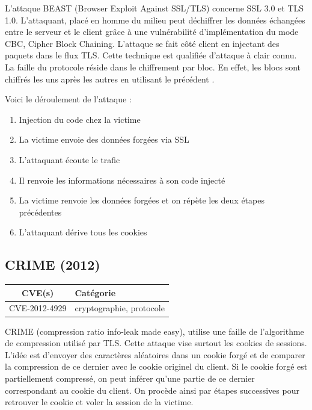 L'attaque BEAST (Browser Exploit Against SSL/TLS) concerne SSL 3.0 et TLS 1.0. L'attaquant, placé en homme du milieu peut déchiffrer les données échangées entre le serveur et le client grâce à une vulnérabilité d'implémentation du mode CBC, Cipher Block Chaining. L'attaque se fait côté client en injectant des paquets dans le flux TLS. Cette technique est qualifiée d'attaque à clair connu. La faille du protocole réside dans le chiffrement par bloc. En effet, les blocs sont chiffrés les uns après les autres en utilisant le précédent \cite{beast}.

Voici le déroulement de l'attaque :

\begin{enumerate}
\item Injection du code chez la victime
\item La victime envoie des données forgées via SSL
\item L'attaquant écoute le trafic
\item Il renvoie les informations nécessaires à son code injecté
\item La victime renvoie les données forgées et on répète les deux étapes précédentes
  \item L'attaquant dérive tous les cookies
\end{enumerate}



\subsection{CRIME (2012)}

\begin{tabularx}{0.96\textwidth}{|c|X|}
  \hline
  \textbf{CVE(s)} & \textbf{Catégorie} \\
  \hline
  CVE-2012-4929 & cryptographie, protocole \\
  \hline
\end{tabularx}

\vspace{1em}

CRIME (compression ratio info-leak made easy), utilise une faille de l'algorithme de compression utilisé par TLS. Cette attaque vise surtout les cookies de sessions. L'idée est d'envoyer des caractères aléatoires dans un cookie forgé et de comparer la compression de ce dernier avec le cookie originel du client. Si le cookie forgé est partiellement compressé, on peut inférer qu'une partie de ce dernier correspondant au cookie du client. On procède ainsi par étapes successives pour retrouver le cookie et voler la session de la victime.

